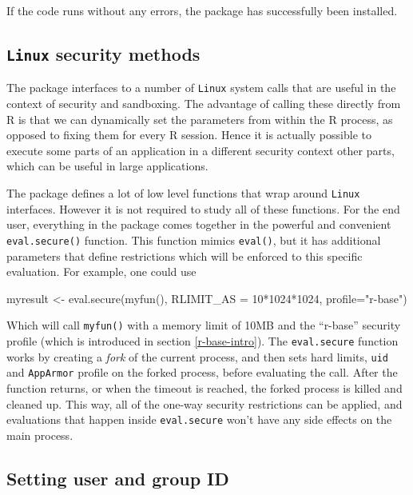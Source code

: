 \documentclass[article]{jss}
\newcommand{\R}{\textsf{R}\xspace}
\newcommand{\AppArmor}{\texttt{AppArmor}\xspace}
\newcommand{\RAppArmor}{\pkg{RAppArmor}\xspace}
\newcommand{\Linux}{\texttt{Linux}\xspace}
\begin{document}
If the code runs without any errors, the package has successfully been
installed.

\subsection[Linux security methods]{\Linux security methods}

The \RAppArmor package interfaces to a number of \Linux system calls that
are useful in the context of security and sandboxing. The advantage of calling
these directly from \R is that we can dynamically set the parameters
from within the \R process, as opposed to fixing them for every
\R session. Hence it is actually possible to execute some parts of an
application in a different security context other parts, which can be useful in
large applications.

The package defines a lot of low level functions that wrap around \Linux
{} interfaces. However it is not required to study all of these
functions. For the end user, everything in the package comes together in the
powerful and convenient \texttt{eval.secure()} function. This function mimics
\texttt{eval()}, but it has additional parameters that define restrictions
which will be enforced to this specific evaluation. For example, one could use

\begin{CodeChunk}
\begin{CodeInput}
myresult <- eval.secure(myfun(), RLIMIT_AS = 10*1024*1024, profile="r-base")
\end{CodeInput}
\end{CodeChunk}

Which will call \texttt{myfun()} with a memory limit of 10MB and the ``r-base''
security profile (which is introduced in section \ref{r-base-intro}). The
\texttt{eval.secure} function works by creating a \emph{fork} of the current
process, and then sets hard limits, \texttt{uid} and \AppArmor profile on the
forked process, before evaluating the call. After the function returns, or when the
timeout is reached, the forked process is killed and cleaned up. This way, all
of the one-way security restrictions can be applied, and evaluations that
happen inside \texttt{eval.secure} won't have any side effects on the main
process.

\subsection{Setting user and group ID}
\end{document}
